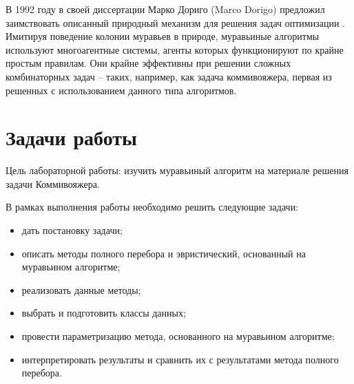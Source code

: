 В 1992 году в своей диссертации Марко Дориго (Marco Dorigo) предложил заимствовать описанный природный механизм для решения задач оптимизации \cite{Dorigo}. Имитируя поведение колонии муравьев в природе, муравьиные алгоритмы используют многоагентные системы, агенты которых функционируют по крайне простым правилам. Они крайне эффективны при решении сложных комбинаторных задач – таких, например, как задача коммивояжера, первая из решенных с использованием данного типа алгоритмов.

\section*{Задачи работы}

Цель лабораторной работы: изучить муравьиный алгоритм на материале решения задачи Коммивояжера.

В рамках выполнения работы необходимо решить следующие задачи:
\begin{itemize}
	\item дать постановку задачи;
	\item описать методы полного перебора и эвристический, основанный на муравьином алгоритме;
	\item реализовать данные методы;
	\item выбрать и подготовить классы данных;
	\item провести параметризацию метода, основанного на муравьином алгоритме;
	\item интерпретировать результаты и сравнить их с результатами метода полного перебора.
\end{itemize}

